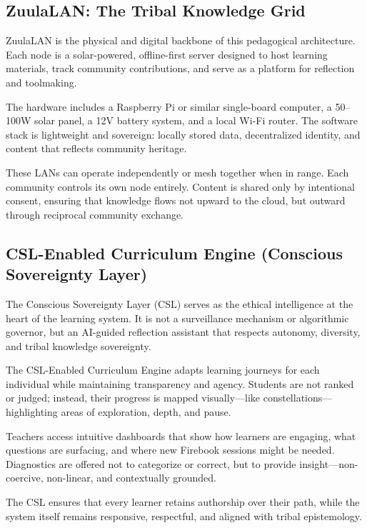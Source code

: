 \documentclass[12pt]{article}
\begin{document}
\subsection*{ZuulaLAN: The Tribal Knowledge Grid}

ZuulaLAN is the physical and digital backbone of this pedagogical architecture. Each node is a solar-powered, offline-first server designed to host learning materials, track community contributions, and serve as a platform for reflection and toolmaking.

The hardware includes a Raspberry Pi or similar single-board computer, a 50–100W solar panel, a 12V battery system, and a local Wi-Fi router. The software stack is lightweight and sovereign: locally stored data, decentralized identity, and content that reflects community heritage.

These LANs can operate independently or mesh together when in range. Each community controls its own node entirely. Content is shared only by intentional consent, ensuring that knowledge flows not upward to the cloud, but outward through reciprocal community exchange.

\subsection*{CSL-Enabled Curriculum Engine (Conscious Sovereignty Layer)}

The Conscious Sovereignty Layer (CSL) serves as the ethical intelligence at the heart of the learning system. It is not a surveillance mechanism or algorithmic governor, but an AI-guided reflection assistant that respects autonomy, diversity, and tribal knowledge sovereignty.

The CSL-Enabled Curriculum Engine adapts learning journeys for each individual while maintaining transparency and agency. Students are not ranked or judged; instead, their progress is mapped visually—like constellations—highlighting areas of exploration, depth, and pause.

Teachers access intuitive dashboards that show how learners are engaging, what questions are surfacing, and where new Firebook sessions might be needed. Diagnostics are offered not to categorize or correct, but to provide insight—non-coercive, non-linear, and contextually grounded.

The CSL ensures that every learner retains authorship over their path, while the system itself remains responsive, respectful, and aligned with tribal epistemology.
\end{document}
